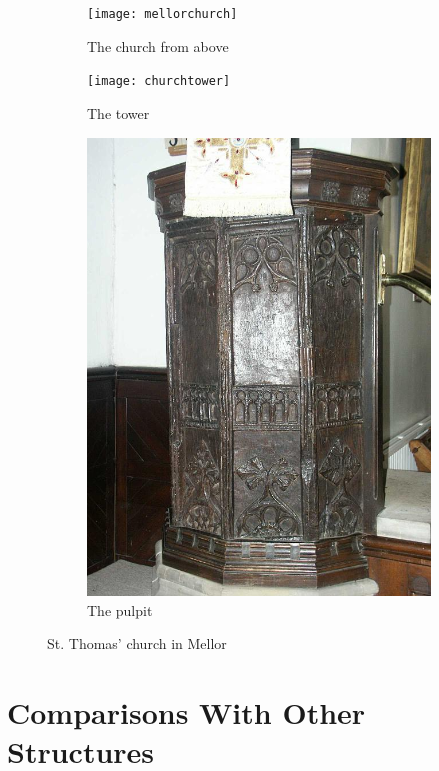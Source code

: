 \documentclass[letterpaper,11pt,titlepage]{article}
\begin{document}
{\begin{figure}
	\centering
	\begin{subfigure}[b]{0.3\textwidth}
		\texttt{[image: mellorchurch]}
		\caption{The church from above}
		\label{fig:mellorchurch}
	\end{subfigure}
	\begin{subfigure}[b]{0.3\textwidth}
		\texttt{[image: churchtower]}
		\caption{The tower}
		\label{fig:churchtower}
	\end{subfigure}
	\begin{subfigure}[b]{0.3\textwidth}
		\includegraphics[width=\textwidth]{pulpit}
		\caption{The pulpit}
		\label{fig:pulpit}
	\end{subfigure}
	\caption{St. Thomas' church in Mellor}\label{fig:thomas}
\end{figure}

\section{Comparisons With Other Structures}
}
\end{document}
